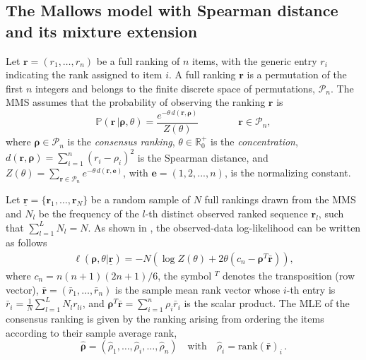 \subsection{The Mallows model with Spearman distance and its mixture extension}
\label{ssec:inference_complete}

Let $\bm{r}=(r_1,\dots,r_n)$ be a full ranking of $n$ items, with the generic entry $r_i$ indicating the rank assigned to item $i$. A full ranking $\bm{r}$ is a permutation of the first $n$ integers and belongs to the finite discrete space of permutations, $\mathcal{P}_n$.
The MMS assumes that the probability of observing the ranking $\bm{r}$ is
 \begin{equation*}
 \label{eq:MM}
\mathbb{P}(\bm{r}\,\vert \bm{\rho},\theta)
=\frac{e^{-\theta\, d(\bm{r},\bm\rho)}}{Z(\theta)}
\qquad\qquad\bm{r}\in\mathcal{P}_n,
\end{equation*}
where $\bm\rho\in\mathcal{P}_n$ is the \textit{consensus ranking}, $\theta\in\mathbb{R}_0^+$ is the \textit{concentration}, $d(\bm{r},\bm\rho)=\sum_{i=1}^n(r_i-\rho_i)^2$ is the Spearman distance, and $Z(\theta)=\sum_{\bm{r} \in \mathcal{P}_{n}} e^{-\theta\, d(\bm{r},\bm e)}$, with $\bm e=(1, 2, ..., n)$, is the normalizing constant. 

Let $\underline{\bm{r}}=\{\bm{r}_1,\dots,\bm{r}_N\}$ be a random sample of $N$ full rankings drawn from the MMS and $N_l$ be the frequency of the $l$-th distinct observed ranked sequence $\bm{r}_l$,
such that $\sum_{l=1}^L N_l=N$. As shown in \cite{crispino23efficient}, the observed-data log-likelihood can be written as follows
\begin{equation*}
\begin{split}
\ell(\bm{\rho},\theta\vert\underline{\bm{r}})
=-N\left(\log{Z(\theta)}+2\theta\left(c_n-\bm{\rho}^T{\bm{\bar r}}\right)\right),
\end{split}
\end{equation*}
where $c_n=n(n+1)(2n+1)/6$, the symbol $^T$ denotes the transposition (row vector),  ${\bm{\bar r}}=(\bar{r}_1,\ldots,\bar{r}_n)$ is the sample mean rank vector whose $i$-th entry is $\bar{r}_i=\frac{1}{N}\sum_{l=1}^LN_lr_{li}$, and $\bm{\rho}^T{\bm{\bar r}}=\sum_{i=1}^n\rho_i\bar{r}_i$ is the scalar product. The MLE of the consensus ranking is given by the 
ranking arising from ordering the items according to their sample average rank, 
\begin{equation*}
    \hat{\bm{\rho}}=(\hat\rho_1,\ldots,\hat\rho_i,\ldots,\hat\rho_n)\quad\text{with}\quad\hat\rho_i=\text{rank}(\bar{\bm r})_i \,.
\end{equation*}


